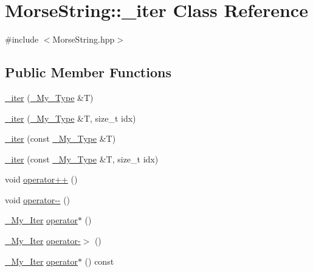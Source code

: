 \hypertarget{class_morse_string_1_1__iter}{\section{Morse\-String\-:\-:\-\_\-iter Class Reference}
\label{class_morse_string_1_1__iter}
}


{\ttfamily \#include $<$Morse\-String.\-hpp$>$}

\subsection*{Public Member Functions}
\begin{DoxyCompactItemize}
\item 
\hyperlink{class_morse_string_1_1__iter_ac445e7b56cd806202b473b1001e8d9cf}{\-\_\-iter} (\hyperlink{class_morse_string_a7f22a5166595e9f06e160159b6b5a878}{\-\_\-\-My\-\_\-\-Type} \&T)
\item 
\hyperlink{class_morse_string_1_1__iter_ad3751ee4ff4201877e681e7b3dba0630}{\-\_\-iter} (\hyperlink{class_morse_string_a7f22a5166595e9f06e160159b6b5a878}{\-\_\-\-My\-\_\-\-Type} \&T, size\-\_\-t idx)
\item 
\hyperlink{class_morse_string_1_1__iter_a3f3661afe55ee02211e9b7dd274af1ab}{\-\_\-iter} (const \hyperlink{class_morse_string_a7f22a5166595e9f06e160159b6b5a878}{\-\_\-\-My\-\_\-\-Type} \&T)
\item 
\hyperlink{class_morse_string_1_1__iter_afe4ed7afd7dae8a0c7f62d19a8a07e7b}{\-\_\-iter} (const \hyperlink{class_morse_string_a7f22a5166595e9f06e160159b6b5a878}{\-\_\-\-My\-\_\-\-Type} \&T, size\-\_\-t idx)
\item 
void \hyperlink{class_morse_string_1_1__iter_ad9dd769bbfd6ff8d8cea6eba511f75b1}{operator++} ()
\item 
void \hyperlink{class_morse_string_1_1__iter_a41f7b406309f8eaec9d3d4bd677cb130}{operator-\/-\/} ()
\item 
\hyperlink{class_morse_string_a9fd4ff95c331104a9e2954921201b8af}{\-\_\-\-My\-\_\-\-Iter} \hyperlink{class_morse_string_1_1__iter_ab3932ec4f6c5757e56391a95527c856f}{operator$\ast$} ()
\item 
\hyperlink{class_morse_string_a9fd4ff95c331104a9e2954921201b8af}{\-\_\-\-My\-\_\-\-Iter} \hyperlink{class_morse_string_1_1__iter_ac4729b3af877e3926ae2eb039c8e9d87}{operator-\/$>$} ()
\item 
\hyperlink{class_morse_string_a9fd4ff95c331104a9e2954921201b8af}{\-\_\-\-My\-\_\-\-Iter} \hyperlink{class_morse_string_1_1__iter_aaddf42dd429574b49b8b97a90258e2cd}{operator$\ast$} () const 

\end{DoxyCompactItemize}
